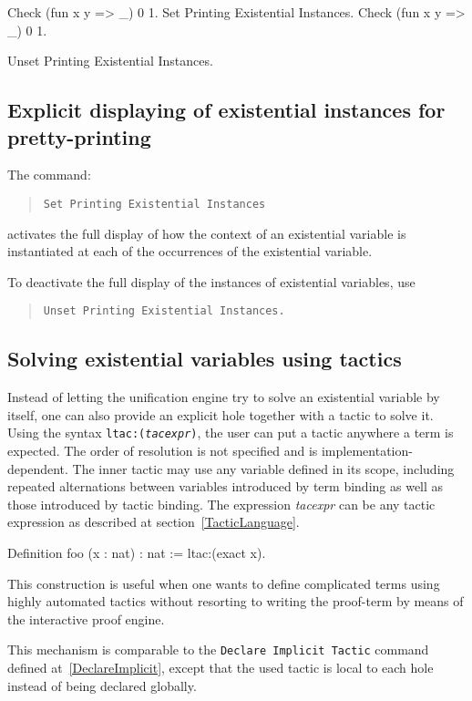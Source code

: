 \begin{coq_example}
Check (fun x y => _) 0 1.
Set Printing Existential Instances.
Check (fun x y => _) 0 1.
\end{coq_example}

\begin{coq_eval}
Unset Printing Existential Instances.
\end{coq_eval}

\subsection{Explicit displaying of existential instances for pretty-printing
\label{SetPrintingExistentialInstances}
}

The command:
\begin{quote}
{\tt Set Printing Existential Instances}
\end{quote}
activates the full display of how the context of an existential variable is
instantiated at each of the occurrences of the existential variable.

To deactivate the full display of the instances of existential
variables, use
\begin{quote}
{\tt Unset Printing Existential Instances.}
\end{quote}

\subsection{Solving existential variables using tactics}

\def\expr{\textrm{\textsl{tacexpr}}}

Instead of letting the unification engine try to solve an existential variable
by itself, one can also provide an explicit hole together with a tactic to solve
it. Using the syntax {\tt ltac:(\expr)}, the user can put a
tactic anywhere a term is expected. The order of resolution is not specified and
is implementation-dependent. The inner tactic may use any variable defined in
its scope, including repeated alternations between variables introduced by term
binding as well as those introduced by tactic binding. The expression {\expr}
can be any tactic expression as described at section~\ref{TacticLanguage}.

\begin{coq_example*}
Definition foo (x : nat) : nat := ltac:(exact x).
\end{coq_example*}

This construction is useful when one wants to define complicated terms using
highly automated tactics without resorting to writing the proof-term by means of
the interactive proof engine.

This mechanism is comparable to the {\tt Declare Implicit Tactic} command
defined at~\ref{DeclareImplicit}, except that the used tactic is local to each
hole instead of being declared globally.

